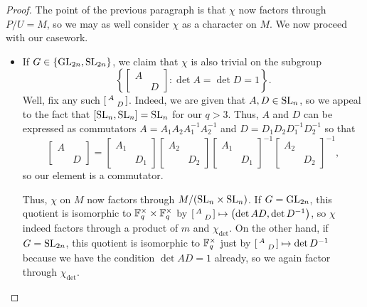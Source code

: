 \begin{proof}
    The point of the previous paragraph is that $\chi$ now factors through $P/U=M$, so we may as well consider $\chi$ as a character on $M$. We now proceed with our casework.
    \begin{itemize}
        \item If $G\in\{\mathrm{GL}_{2n},\mathrm{SL}_{2n}\}$, we claim that $\chi$ is also trivial on the subgroup
        \[\left\{\begin{bmatrix}
            A &   \\
              & D
        \end{bmatrix}:\det A=\det D=1\right\}.\]
        Well, fix any such $\begin{bsmallmatrix}
            A \\ & D
        \end{bsmallmatrix}$. Indeed, we are given that $A,D\in\mathrm{SL}_{n}$, so we appeal to the fact that $[\mathrm{SL}_{n},\mathrm{SL}_{n}]=\mathrm{SL}_{n}$ for our $q>3$. Thus, $A$ and $D$ can be expressed as commutators $A=A_1A_2A_1^{-1}A_2^{-1}$ and $D=D_1D_2D_1^{-1}D_2^{-1}$ so that 
        \[\begin{bmatrix}
            A \\ & D
        \end{bmatrix}=\begin{bmatrix}
            A_1 \\ & D_1
        \end{bmatrix}\begin{bmatrix}
            A_2 \\ & D_2
        \end{bmatrix}\begin{bmatrix}
            A_1 \\ & D_1
        \end{bmatrix}^{-1}\begin{bmatrix}
            A_2 \\ & D_2
        \end{bmatrix}^{-1},\]
        so our element is a commutator.
        
        Thus, $\chi$ on $M$ now factors through $M/(\mathrm{SL}_n\times\mathrm{SL}_n)$. If $G=\mathrm{GL}_{2n}$, this quotient is isomorphic to $\mathbb F_q^\times\times\mathbb F_q^\times$ by $\begin{bsmallmatrix}
            A \\ & D
        \end{bsmallmatrix}\mapsto\left(\det AD,\det D^{-1}\right)$, so $\chi$ indeed factors through a product of $m$ and $\chi_{\det}$. On the other hand, if $G=\mathrm{SL}_{2n}$, this quotient is isomorphic to $\mathbb F_q^\times$ just by $\begin{bsmallmatrix}
            A \\ & D
        \end{bsmallmatrix}\mapsto\det D^{-1}$ because we have the condition $\det AD=1$ already, so we again factor through $\chi_{\det}$.


\end{itemize}
\end{proof}
